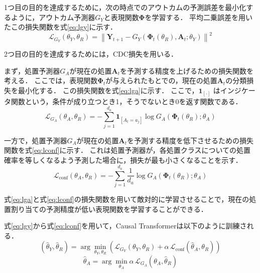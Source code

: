 \documentclass[dvipdfmx]{jreport}
\begin{document}
\newpage

1つ目の目的を達成するために，次の時点でのアウトカムの予測誤差を最小化するように，アウトカム予測器$G_Y$と表現関数$\boldsymbol{\Phi}$を学習する．
平均二乗誤差を用いたこの損失関数を式\eqref{eq:lgy}に示す．
\begin{equation}
    \mathcal{L}_{G_Y}(\theta_Y, \theta_R) = \left\| \mathbf{Y}_{t+1} - G_Y\left( \boldsymbol{\Phi}_t(\theta_R), \mathbf{A}_t; \theta_Y \right) \right\|^2 \label{eq:lgy}
\end{equation}

2つ目の目的を達成するためには，CDC損失を用いる．

まず，処置予測器$G_A$が現在の処置$\mathbf{A}_t$を予測する精度を上げるための損失関数を考える．
ここでは，表現関数$\boldsymbol{\Phi}_t$が与えられたもとでの，現在の処置$\mathbf{A}_t$の分類損失を最小化する．
この損失関数を式\eqref{eq:lga}に示す．
ここで，$\mathbf{1}_{[\cdot]}$ はインジケータ関数という，条件が成り立つとき1，そうでないとき0を返す関数である．
\begin{equation}
    \mathcal{L}_{G_A}(\theta_A, \theta_R) = - \sum_{j=1}^{d_a} \mathbf{1}_{[A_t = a_j]} \log G_A\left( \boldsymbol{\Phi}_t(\theta_R); \theta_A \right) \label{eq:lga}
\end{equation}


一方で，処置予測器$G_A$が現在の処置$\mathbf{A}_t$を予測する精度を低下させるための損失関数を式\eqref{eq:lconf}に示す．
これは処置予測器が，各処置クラスについての処置確率を等しくなるよう予測した場合に，損失が最も小さくなることを示す．
\begin{equation}
    \mathcal{L}_{\text{conf}}(\theta_A, \theta_R) = - \sum_{j=1}^{d_a} \frac{1}{d_a} \log G_A\left( \boldsymbol{\Phi}_t(\theta_R); \theta_A \right) \label{eq:lconf}
\end{equation}

式\eqref{eq:lga}と式\eqref{eq:lconf}の損失関数を用いて敵対的に学習させることで，現在の処置割り当ての予測精度が低い表現関数を学習することができる．

式\eqref{eq:lgy}から式\eqref{eq:lconf}を用いて，Causal Transformerは以下のように訓練される．
\begin{equation}
    (\hat{\theta}_Y, \hat{\theta}_R) = \arg\min_{\theta_Y, \theta_R} 
    \left( \mathcal{L}_{G_Y}(\theta_Y, \theta_R) + \alpha \, \mathcal{L}_{\text{conf}}(\hat{\theta}_A, \theta_R) \right) \label{eq:yr}
\end{equation} 
\begin{equation}
    \hat{\theta}_A = \arg\min_{\theta_A} \alpha \, \mathcal{L}_{G_A}(\theta_A, \hat{\theta}_R) \label{eq:a}
\end{equation}
\end{document}
